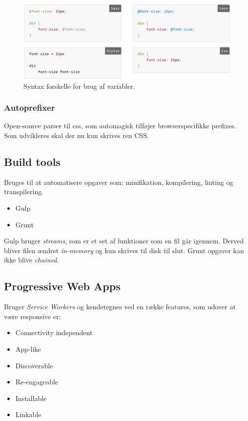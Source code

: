 \begin{figure}[H]
	\centering
	\includegraphics[width=\linewidth]{figs/spm3/css-prepro-variables}
	\caption{Syntax forskelle for brug af variabler.}
	\label{fig:css-prepro-variables}
\end{figure}

\subsubsection{Autoprefixer}
Open-source parser til css, som automagisk tilføjer browserspecifikke prefixes. Som udvikleres skal der nu kun skrives ren CSS. 

\subsection{Build tools}
Bruges til at automatisere opgaver som: minifikation, kompilering, linting og transpilering.

\begin{itemize}
	\item Gulp 
	\item Grunt
\end{itemize}

Gulp bruger \textit{streams}, som er et set af funktioner som en fil går igennem. Derved bliver filen ændret \textit{in-memory} og kun skrives til disk til slut. Grunt opgaver kan ikke blive \textit{chained}.

\subsection{Progressive Web Apps}
Bruger \textit{Service Workers} og kendetegnes ved en række features, som udover at være responsive er:

\begin{multicols}{2}
\begin{itemize}
	\item Connectivity independent
	\item App-like
	\item Discoverable
	\item Re-engageable
	\item Installable
	\item Linkable
\end{itemize}
\end{multicols}

